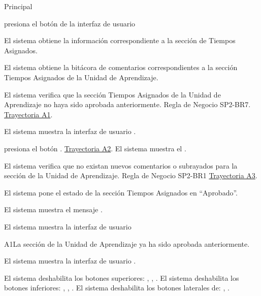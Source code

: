 \begin{UCtrayectoria}{Principal}

    \UCpaso[\UCactor] presiona el botón   de la interfaz de usuario 

    \UCpaso El sistema obtiene la información correspondiente a la sección de Tiempos Asignados.
    
    \UCpaso El sistema obtiene la bitácora de comentarios correspondientes a la sección Tiempos Asignados de la Unidad de Aprendizaje. 
    
    \UCpaso El sistema verifica que la sección Tiempos Asignados de la Unidad de Aprendizaje no haya sido aprobada anteriormente. Regla de Negocio SP2-BR7. \hyperlink{SP2-CU8-A1}{Trayectoria A1}. 
    
    \UCpaso El sistema muestra la interfaz de usuario  .
    
    \UCpaso[\UCactor] presiona el botón . \hyperlink{SP2-CU8-A2}{Trayectoria A2}.
    \UCpaso El sistema muestra el .
    
    \UCpaso	El sistema verifica que no existan nuevos comentarios o subrayados para la sección de la Unidad de Aprendizaje. Regla de Negocio  SP2-BR1 \hyperlink{SP2-CU8-A3}{Trayectoria A3}. 
    
    \UCpaso El sistema pone el estado de la sección Tiempos Asignados  en “Aprobado”.
    
    \UCpaso El sistema muestra el mensaje .

    \UCpaso El sistema muestra la interfaz de usuario 

\end{UCtrayectoria}


\begin{UCtrayectoriaA}{A1}{La sección de la Unidad de Aprendizaje ya ha sido aprobada anteriormente.}

	\hypertarget{SP2-CU8-A1}{\UCpaso El sistema muestra la interfaz de usuario .}
    \UCpaso El sistema deshabilita los botones superiores: , , .
    \UCpaso El sistema deshabilita los botones inferiores: , , .
    \UCpaso El sistema deshabilita los botones laterales de: , .
\end{UCtrayectoriaA}

